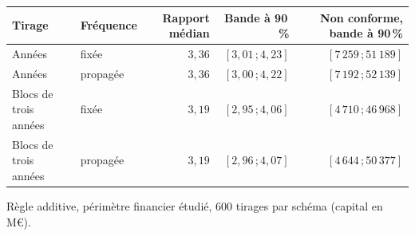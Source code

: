 \begin{center}\footnotesize
\renewcommand{\arraystretch}{1.15}
\begin{tabular}{@{}llrrr@{}}
\toprule
\textbf{Tirage} & \textbf{Fréquence} & \textbf{Rapport médian} & \textbf{Bande à 90\,\%} & \textbf{Non conforme, bande à 90\,\%} \\
\midrule
Années & fixée & $3{,}36$ & $[3{,}01\,;4{,}23]$ & $[7\,259\,;51\,189]$ \\
Années & propagée & $3{,}36$ & $[3{,}00\,;4{,}22]$ & $[7\,192\,;52\,139]$ \\
Blocs de trois années & fixée & $3{,}19$ & $[2{,}95\,;4{,}06]$ & $[4\,710\,;46\,968]$ \\
Blocs de trois années & propagée & $3{,}19$ & $[2{,}96\,;4{,}07]$ & $[4\,644\,;50\,377]$ \\
\bottomrule
\end{tabular}
\end{center}
\noindent Règle additive, périmètre financier étudié, 600 tirages par schéma (capital en M\euro).
